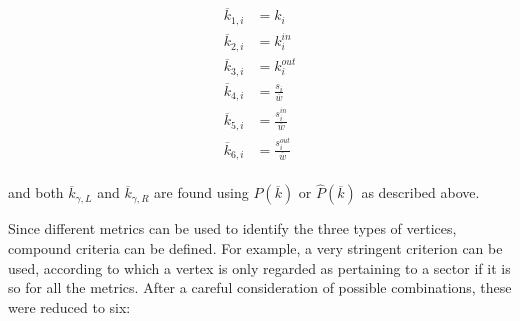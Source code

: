 \documentclass[%
 aip,
 jmp,%
 amsmath,amssymb,
 reprint,%
]{revtex4-1}
\begin{document}
\begin{equation}
\begin{split}
\overline{k}_{1,i}&=k_i \\
\overline{k}_{2,i}&=k_i^{in} \\
\overline{k}_{3,i}&=k_i^{out} \\
\overline{k}_{4,i}&=\frac{s_i}{\overline{w}} \\
\overline{k}_{5,i}&=\frac{s_i^{in}}{\overline{w}} \\
\overline{k}_{6,i}&=\frac{s_i^{out}}{\overline{w}} \\
\end{split}
\end{equation}

\noindent and both $\overline{k}_{\gamma,L}$ and $\overline{k}_{\gamma,R}$ are found using $P(\overline{k})$ or $\hat{P}(\overline{k})$ as described above.

Since different metrics can be used to identify the three types of vertices, compound criteria can be defined. For example, a very stringent criterion can be used, according to which a vertex is only regarded as pertaining to a sector if it is so for all the metrics. After a careful consideration of possible combinations, these were reduced to six:
\end{document}
